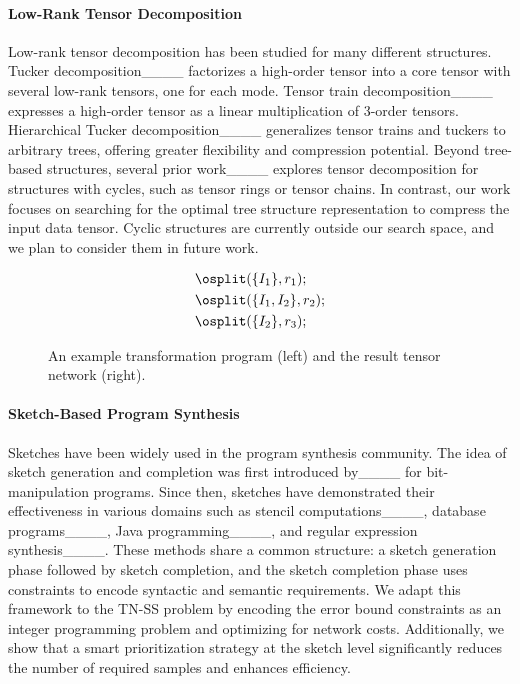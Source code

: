 \paragraph{Low-Rank Tensor Decomposition}
%
Low-rank tensor decomposition has been studied for many different structures.
%
Tucker decomposition____ factorizes a high-order tensor into a core tensor with several low-rank tensors, one for each mode.
%
Tensor train decomposition____ expresses a high-order tensor as a linear multiplication of 3-order tensors.
%
Hierarchical Tucker decomposition____ generalizes tensor trains and tuckers to arbitrary trees, offering greater flexibility and compression potential.
%
Beyond tree-based structures, several prior work____ explores tensor decomposition for structures with cycles, such as tensor rings or tensor chains.
%
In contrast, our work focuses on searching for the optimal tree structure representation to compress the input data tensor.
%
Cyclic structures are currently outside our search space, and we plan to consider them in future work.
%
\begin{figure}[t]
    \centering
    \begin{minipage}{.4\linewidth}
    \centering
    \small
    \begin{align*}
        &\osplit(\{I_1\}, r_1);\\
        &\osplit(\{I_1, I_2\}, r_2);\\
        &\osplit(\{I_2\}, r_3);
    \end{align*}
    \end{minipage}
    \hfill
    \begin{minipage}{.55\linewidth}
    \centering
    \resizebox{.85\linewidth}{!}{
        
    }
    \end{minipage}    
    \caption{An example transformation program (left) and the result tensor network (right).}
    \label{fig:example-program}
\end{figure}
\paragraph{Sketch-Based Program Synthesis}
%
Sketches have been widely used in the program synthesis community.
%
The idea of sketch generation and completion was first introduced by____ for bit-manipulation programs.
%
Since then, sketches have demonstrated their effectiveness in various domains such as stencil computations____, database programs____, Java programming____,  and regular expression synthesis____.
%
These methods share a common structure: a sketch generation phase followed by sketch completion, and the sketch completion phase uses constraints to encode syntactic and semantic requirements.
%
We adapt this framework to the TN-SS problem by encoding the error bound constraints as an integer programming problem and optimizing for network costs.
%
Additionally, we show that a smart prioritization strategy at the sketch level significantly reduces the number of required samples and enhances efficiency.